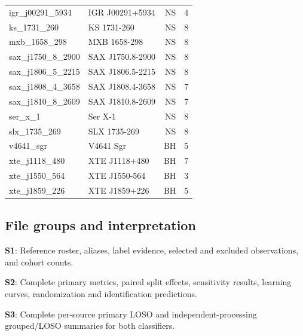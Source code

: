 \documentclass[final,5p,authoryear,nopreprintline]{elsarticle}
\begin{document}
\begin{table}[!tp]
\begin{tabular}{llrr}
igr\_j00291\_5934 & IGR J00291+5934 & NS & 4 \\

ks\_1731\_260 & KS 1731-260 & NS & 8 \\

mxb\_1658\_298 & MXB 1658-298 & NS & 8 \\

sax\_j1750\_8\_2900 & SAX J1750.8-2900 & NS & 8 \\

sax\_j1806\_5\_2215 & SAX J1806.5-2215 & NS & 8 \\

sax\_j1808\_4\_3658 & SAX J1808.4-3658 & NS & 7 \\

sax\_j1810\_8\_2609 & SAX J1810.8-2609 & NS & 7 \\

ser\_x\_1 & Ser X-1 & NS & 8 \\

slx\_1735\_269 & SLX 1735-269 & NS & 8 \\

v4641\_sgr & V4641 Sgr & BH & 5 \\

xte\_j1118\_480 & XTE J1118+480 & BH & 7 \\

xte\_j1550\_564 & XTE J1550-564 & BH & 3 \\

xte\_j1859\_226 & XTE J1859+226 & BH & 5 \\

\bottomrule\end{tabular}
\end{table}

\subsection*{File groups and interpretation}

\noindent\textbf{S1}: Reference roster, aliases, label evidence, selected and excluded observations, and cohort counts.\par\smallskip

\noindent\textbf{S2}: Complete primary metrics, paired split effects, sensitivity results, learning curves, randomization and identification predictions.\par\smallskip

\noindent\textbf{S3}: Complete per-source primary LOSO and independent-processing grouped/LOSO summaries for both classifiers.\par\smallskip
\end{document}
